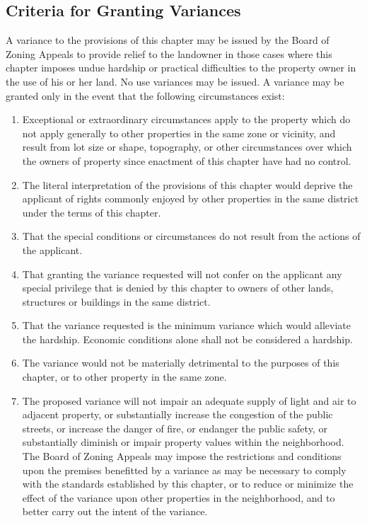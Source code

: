 \subsection{Criteria for Granting Variances}
A variance to the provisions of this chapter may be issued by the Board of Zoning Appeals to provide relief to the landowner in those cases where this chapter imposes undue hardship or practical difficulties to the property owner in the use of his or her land.  No use variances may be issued.  A variance may be granted only in the event that the following circumstances exist:
\begin{enumerate}[{\indent}1)]
    \item Exceptional or extraordinary circumstances apply to the property which do not apply generally to other properties in the same zone or vicinity, and result from lot size or shape, topography, or other circumstances over which the owners of property since enactment of this chapter have had no control.
    \item The literal interpretation of the provisions of this chapter would deprive the applicant of rights commonly enjoyed by other properties in the same district under the terms of this chapter.
    \item That the special conditions or circumstances do not result from the actions of the applicant.
    \item That granting the variance requested will not confer on the applicant any special privilege that is denied by this chapter to owners of other lands, structures or buildings in the same district.
    \item That the variance requested is the minimum variance which would alleviate the hardship.  Economic conditions alone shall not be considered a hardship.
    \item The variance would not be materially detrimental to the purposes of this chapter, or to other property in the same zone.
    \item The proposed variance will not impair an adequate supply of light and air to adjacent property, or substantially increase the congestion of the public streets, or increase the danger of fire, or endanger the public safety, or substantially diminish or impair property values within the neighborhood. The Board of Zoning Appeals may impose the restrictions and conditions upon the premises benefitted by a variance as may be necessary to comply with the standards established by this chapter, or to reduce or minimize the effect of the variance upon other properties in the neighborhood, and to better carry out the intent of the variance.
\end{enumerate}
